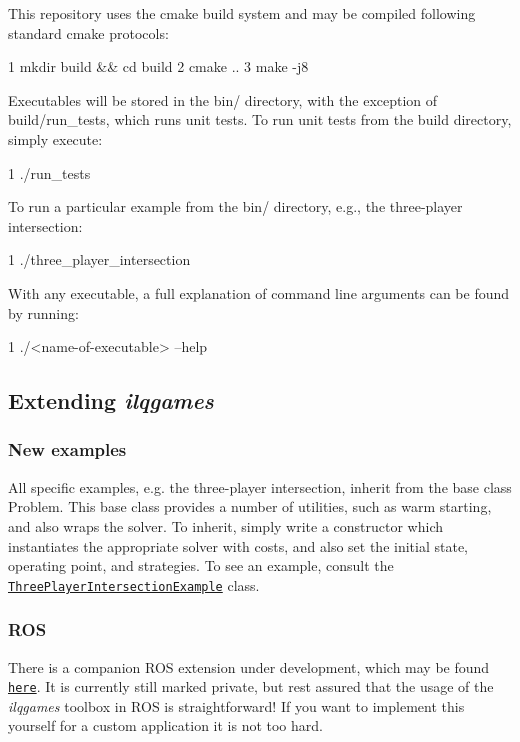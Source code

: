 This repository uses the {\ttfamily cmake} build system and may be compiled following standard cmake protocols\+: 
\begin{DoxyCode}
1 mkdir build && cd build
2 cmake ..
3 make -j8
\end{DoxyCode}


Executables will be stored in the {\ttfamily bin/} directory, with the exception of {\ttfamily build/run\+\_\+tests}, which runs unit tests. To run unit tests from the build directory, simply execute\+: 
\begin{DoxyCode}
1 ./run\_tests
\end{DoxyCode}


To run a particular example from the {\ttfamily bin/} directory, e.\+g., the three-\/player intersection\+: 
\begin{DoxyCode}
1 ./three\_player\_intersection
\end{DoxyCode}


With any executable, a full explanation of command line arguments can be found by running\+: 
\begin{DoxyCode}
1 ./<name-of-executable> --help
\end{DoxyCode}


\subsection*{Extending {\itshape ilqgames}}

\subsubsection*{New examples}

All specific examples, e.\+g. the three-\/player intersection, inherit from the base class {\ttfamily Problem}. This base class provides a number of utilities, such as warm starting, and also wraps the solver. To inherit, simply write a constructor which instantiates the appropriate solver with costs, and also set the initial state, operating point, and strategies. To see an example, consult the \href{https://github.com/HJReachability/ilqgames/blob/master/src/three_player_intersection_example.cpp}{\tt Three\+Player\+Intersection\+Example} class.

\subsubsection*{R\+OS}

There is a companion R\+OS extension under development, which may be found \href{https://github.com/HJReachability/ilqgames_ros}{\tt here}. It is currently still marked private, but rest assured that the usage of the {\itshape ilqgames} toolbox in R\+OS is straightforward! If you want to implement this yourself for a custom application it is not too hard.

